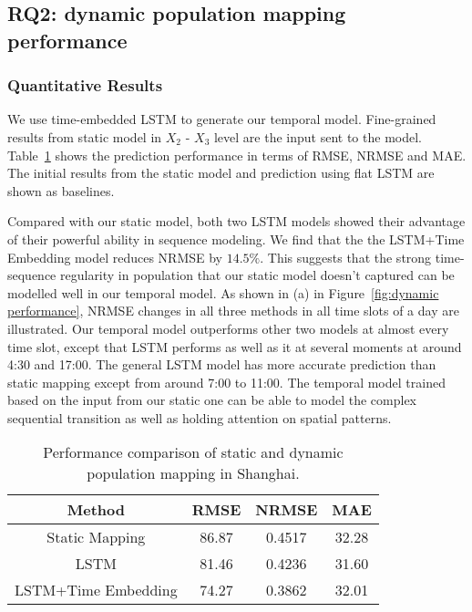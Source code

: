 \documentclass[letterpaper]{article} %
\begin{document}
\subsection{RQ2: dynamic population mapping performance}

\subsubsection{Quantitative Results}

We use time-embedded LSTM to generate our temporal model. Fine-grained results from static model in $X_{2}$ - $X_{3}$ level are the input sent to the model. Table~\ref{tab:SHperformance} shows the prediction performance in terms of RMSE, NRMSE and MAE. The initial results from the static model and prediction using flat LSTM are shown as baselines.

Compared with our static model, both two LSTM models showed their advantage of their powerful ability in sequence modeling. We find that the the LSTM+Time Embedding model reduces NRMSE by $14.5\%$. This suggests that the strong time-sequence regularity in population that our static model doesn't captured can be modelled well in our temporal model. As shown in (a) in Figure~\ref{fig:dynamic performance}, NRMSE changes in all three methods in all time slots of a day are illustrated. Our temporal model outperforms other two models at almost every time slot, except that LSTM performs as well as it at several moments at around 4:30 and 17:00. The general LSTM model has more accurate prediction than static mapping except from around 7:00 to 11:00. The temporal model trained based on the input from our static one can be able to model the complex sequential transition as well as holding attention on spatial patterns.
\begin{table}[h]
\small
\begin{center}
\caption{Performance comparison of static and dynamic population mapping in Shanghai.}\label{tab:SHperformance}
\begin{tabular}{cccc}
\toprule
Method&RMSE&NRMSE&MAE\\
\midrule
Static Mapping&86.87&0.4517&32.28\\
LSTM&81.46&0.4236&31.60\\
LSTM+Time Embedding&74.27&0.3862&32.01\\
\bottomrule
\end{tabular}
\end{center}
\end{table}
\end{document}
